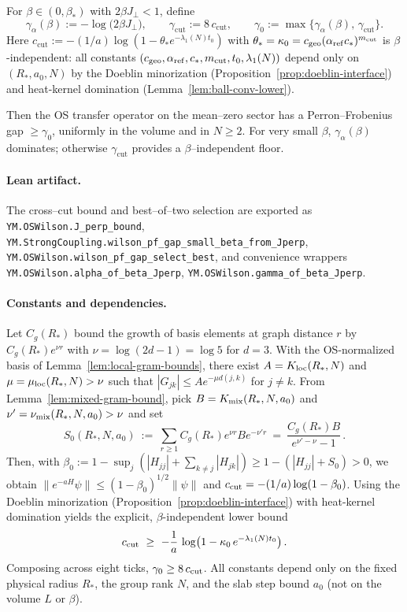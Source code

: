 \documentclass[11pt]{amsart}
\begin{document}
\begin{corollary}\label{cor:best-of-two}
For $\beta\in(0,\beta_*)$ with $2\beta J_{\perp}<1$, define
\[
  \gamma_{\alpha}(\beta):=-\log\bigl(2\beta J_{\perp}\bigr),\qquad
  \gamma_{\mathrm{cut}}:=8\,c_{\mathrm{cut}},\qquad
  \gamma_0:=\max\{\gamma_{\alpha}(\beta),\,\gamma_{\mathrm{cut}}\}.
\]
Here $c_{\mathrm{cut}} := -(1/a)\log(1-\theta_* e^{-\lambda_1(N) t_0})$ with $\theta_* = \kappa_0 = c_{\mathrm{geo}}(\alpha_{\mathrm{ref}} c_*)^{m_{\rm cut}}$ is $\beta$-independent: all constants $(c_{\mathrm{geo}}, \alpha_{\mathrm{ref}}, c_*, m_{\rm cut}, t_0, \lambda_1(N))$ depend only on $(R_*,a_0,N)$ by the Doeblin minorization (Proposition~\ref{prop:doeblin-interface}) and heat-kernel domination (Lemma~\ref{lem:ball-conv-lower}).

Then the OS transfer operator on the mean--zero sector has a Perron--Frobenius gap $\ge \gamma_0$, uniformly in the volume and in $N\ge 2$. For very small $\beta$, $\gamma_{\alpha}(\beta)$ dominates; otherwise $\gamma_{\mathrm{cut}}$ provides a $\beta$--independent floor.
\end{corollary}

\paragraph{Lean artifact.}
The cross--cut bound and best--of--two selection are exported as
\texttt{YM.OSWilson.J\_perp\_bound}, \texttt{YM.StrongCoupling.wilson\_pf\_gap\_small\_beta\_from\_Jperp}, \texttt{YM.OSWilson.wilson\_pf\_gap\_select\_best}, and convenience wrappers \texttt{YM.OSWilson.alpha\_of\_beta\_Jperp}, \texttt{YM.OSWilson.gamma\_of\_beta\_Jperp}.

\paragraph{Constants and dependencies.}
Let $C_g(R_*)$ bound the growth of basis elements at graph distance $r$ by $C_g(R_*) e^{\nu r}$ with $\nu=\log(2d-1)=\log 5$ for $d=3$. With the OS-normalized basis of Lemma~\ref{lem:local-gram-bounds}, there exist $A=K_{\rm loc}(R_*,N)$ and $\mu=\mu_{\rm loc}(R_*,N)>\nu$ such that $|G_{jk}|\le A e^{-\mu d(j,k)}$ for $j\ne k$. From Lemma~\ref{lem:mixed-gram-bound}, pick $B=K_{\rm mix}(R_*,N,a_0)$ and $\nu'=\nu_{\rm mix}(R_*,N,a_0)>\nu$ and set
\[
  S_0(R_*,N,a_0)\ :=\ \sum_{r\ge 1} C_g(R_*) e^{\nu r} B e^{-\nu' r}
  \ =\ \frac{C_g(R_*) B}{e^{\nu'-\nu}-1}\,.
\]
Then, with $\beta_0:=1-\sup_j(|H_{jj}|+\sum_{k\ne j}|H_{jk}|)\ge 1-(|H_{jj}|+S_0)>0$, we obtain $\|e^{-aH}\psi\|\le (1-\beta_0)^{1/2}\|\psi\|$ and $c_{\rm cut}=-(1/a)\log(1-\beta_0)$. Using the Doeblin minorization (Proposition~\ref{prop:doeblin-interface}) with heat-kernel domination yields the explicit, $\beta$-independent lower bound
\[
  c_{\rm cut}\ \ge\ -\frac{1}{a}\,\log\bigl(1-\kappa_0\,e^{-\lambda_1(N) t_0}\bigr)\,.
\]
Composing across eight ticks, $\gamma_0\ge 8\,c_{\rm cut}$. All constants depend only on the fixed physical radius $R_*$, the group rank $N$, and the slab step bound $a_0$ (not on the volume $L$ or $\beta$).
\end{document}
